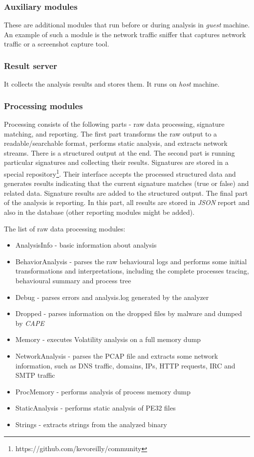 \subsubsection*{Auxiliary modules}
These are additional modules that run before or during analysis in \emph{guest} machine. An example of such a module is the network traffic sniffer that captures network traffic or a screenshot capture tool.

\subsubsection*{Result server}
It collects the analysis results and stores them. It runs on \emph{host} machine.

\subsubsection*{Processing modules}
Processing consists of the following parts - raw data processing, signature matching, and reporting. The first part transforms the raw output to a readable/searchable format, performs static analysis, and extracts network streams. There is a structured output at the end. The second part is running particular signatures and collecting their results. Signatures are stored in a special repository\footnote{https://github.com/kevoreilly/community}. Their interface accepts the processed structured data and generates results indicating that the current signature matches (true or false) and related data. Signature results are added to the structured output. The final part of the analysis is reporting. In this part, all results are stored in \emph{JSON} report and also in the database (other reporting modules might be added).

The list of raw data processing modules:
\begin{itemize}
  \itemsep0em 
  \item AnalysisInfo - basic information about analysis
  \item BehaviorAnalysis - parses the raw behavioural logs and performs some initial transformations and interpretations, including the complete processes tracing, behavioural summary and process tree
  \item Debug - parses errors and analysis.log generated by the analyzer
  \item Dropped - parses information on the dropped files by malware and dumped by \emph{CAPE}
  \item Memory - executes Volatility analysis on a full memory dump
  \item NetworkAnalysis - parses the PCAP file and extracts some network information, such as DNS traffic, domains, IPs, HTTP requests, IRC and SMTP traffic
  \item ProcMemory - performs analysis of process memory dump
  \item StaticAnalysis - performs static analysis of PE32 files
  \item Strings - extracts strings from the analyzed binary
\end{itemize}


